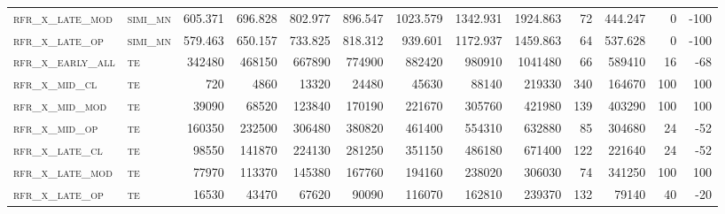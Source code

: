 \begin{landscape}
\begin{center}
\begin{footnotesize}
\begin{longtable}{llrrrrrrrr|rrr}
\textsc{rfr\_x\_late\_mod } & \textsc{simi\_mn  }   & 605.371 & 696.828 & 802.977 & 896.547  & 1023.579 & 1342.931 & 1924.863 & 72     & 444.247       & 0             & -100            \\
\textsc{rfr\_x\_late\_op  } & \textsc{simi\_mn  }   & 579.463 & 650.157 & 733.825 & 818.312  & 939.601  & 1172.937 & 1459.863 & 64     & 537.628       & 0             & -100            \\
\textsc{rfr\_x\_early\_all} & \textsc{te  	    }   & 342480  & 468150  & 667890  & 774900   & 882420   & 980910   & 1041480  & 66     & 589410        & 16            & -68             \\
\textsc{rfr\_x\_mid\_cl   } & \textsc{te        }   & 720     & 4860    & 13320   & 24480    & 45630    & 88140    & 219330   & 340    & 164670        & 100           & 100             \\
\textsc{rfr\_x\_mid\_mod  } & \textsc{te        }   & 39090   & 68520   & 123840  & 170190   & 221670   & 305760   & 421980   & 139    & 403290        & 100           & 100             \\
\textsc{rfr\_x\_mid\_op   } & \textsc{te        }   & 160350  & 232500  & 306480  & 380820   & 461400   & 554310   & 632880   & 85     & 304680        & 24            & -52             \\
\textsc{rfr\_x\_late\_cl  } & \textsc{te        }   & 98550   & 141870  & 224130  & 281250   & 351150   & 486180   & 671400   & 122    & 221640        & 24            & -52             \\
\textsc{rfr\_x\_late\_mod } & \textsc{te        }   & 77970   & 113370  & 145380  & 167760   & 194160   & 238020   & 306030   & 74     & 341250        & 100           & 100             \\
\textsc{rfr\_x\_late\_op  } & \textsc{te        }   & 16530   & 43470   & 67620   & 90090    & 116070   & 162810   & 239370   & 132    & 79140         & 40            & -20            

\end{longtable}
\end{footnotesize}
\end{center}
\end{landscape}

\restoregeometry
\pagestyle{headings}


